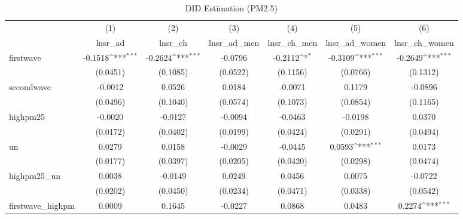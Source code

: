 \begin{table}[htbp]\centering
\def\sym#1{\ifmmode^{#1}\else\(^{#1}\)\fi}
\caption{DID Estimation (PM2.5)}
\begin{tabular}{l*{6}{c}}
\hline\hline
            &\multicolumn{1}{c}{(1)}&\multicolumn{1}{c}{(2)}&\multicolumn{1}{c}{(3)}&\multicolumn{1}{c}{(4)}&\multicolumn{1}{c}{(5)}&\multicolumn{1}{c}{(6)}\\
            &\multicolumn{1}{c}{lnsr\_ad}&\multicolumn{1}{c}{lnsr\_ch}&\multicolumn{1}{c}{lnsr\_ad\_men}&\multicolumn{1}{c}{lnsr\_ch\_men}&\multicolumn{1}{c}{lnsr\_ad\_women}&\multicolumn{1}{c}{lnsr\_ch\_women}\\
\hline
firstwave   &     -0.1518\sym{***}&     -0.2624\sym{***}&     -0.0796         &     -0.2112\sym{*}  &     -0.3109\sym{***}&     -0.2649\sym{***}\\
            &    (0.0451)         &    (0.1085)         &    (0.0522)         &    (0.1156)         &    (0.0766)         &    (0.1312)         \\
[1em]
secondwave  &     -0.0012         &      0.0526         &      0.0184         &     -0.0071         &      0.1179         &     -0.0896         \\
            &    (0.0496)         &    (0.1040)         &    (0.0574)         &    (0.1073)         &    (0.0854)         &    (0.1165)         \\
[1em]
highpm25    &     -0.0020         &     -0.0127         &     -0.0094         &     -0.0463         &     -0.0198         &      0.0370         \\
            &    (0.0172)         &    (0.0402)         &    (0.0199)         &    (0.0424)         &    (0.0291)         &    (0.0494)         \\
[1em]
un          &      0.0279         &      0.0158         &     -0.0029         &     -0.0445         &      0.0593\sym{***}&      0.0173         \\
            &    (0.0177)         &    (0.0397)         &    (0.0205)         &    (0.0420)         &    (0.0298)         &    (0.0474)         \\
[1em]
highpm25\_un &      0.0038         &     -0.0149         &      0.0249         &      0.0456         &      0.0075         &     -0.0722         \\
            &    (0.0202)         &    (0.0450)         &    (0.0234)         &    (0.0471)         &    (0.0338)         &    (0.0542)         \\
[1em]
firstwave\_highpm&      0.0009         &      0.1645         &     -0.0227         &      0.0868         &      0.0483         &      0.2274\sym{***}\\

\end{tabular}
\end{table}
